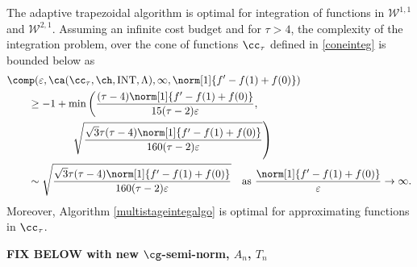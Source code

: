 \begin{theorem} \label{complowbdinteg} The adaptive trapezoidal algorithm is optimal for integration of functions in $\mathcal{W}^{1,1}$ and $\mathcal{W}^{2,1}$. Assuming an infinite cost budget and for $\tau>4$, the complexity of the integration problem, over the cone of functions $\cc_{\tau}$ defined in \eqref{coneinteg} is bounded below as
\begin{align*}
\MoveEqLeft{\comp(\varepsilon,\ca(\cc_{\tau},\ch,\INT,\Lambda),\infty,\norm[1]{f'-f(1) + f(0)})}\\
&\ge -1+ \min\left(\frac{(\tau-4)\norm[1]{f'-f(1)+f(0)}}{15(\tau-2) \varepsilon}, \right .\\
&\qquad \qquad \left . \sqrt{\frac{\sqrt{3}\tau(\tau-4)\norm[1]{f'-f(1)+f(0)}}{160(\tau-2)\varepsilon}} \right)\\
& \sim \sqrt{\frac{\sqrt{3}\tau(\tau-4)\norm[1]{f'-f(1)+f(0)}}{160(\tau-2)\varepsilon}}   \quad\text{as } \frac{\norm[1]{f'-f(1)+f(0)}}{\varepsilon} \to \infty.
\end{align*}
Moreover, Algorithm \ref{multistageintegalgo} is optimal for approximating functions in $\cc_{\tau}$.
\end{theorem}

{\bf FIX BELOW with new $\cg$-semi-norm, $A_n$, $T_n$}


